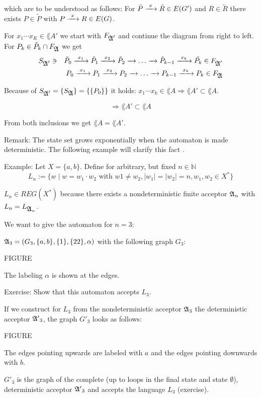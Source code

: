 which are to be understood as follows: For $\tilde{P} \xrightarrow{\ {x}\ } \tilde{R} \in
E(G')$ and $R \in \tilde{R}$ there exists $P \in \tilde{P}$ with $P \xrightarrow{\ {x}\ } R
\in E(G)$.

For $x_1 \cdots x_K \in \lang{A'}$ we start with $F_{\mbox{$\mathfrak{A'}$}}$ and continue
the diagram from right to left. For $P_k \in \tilde{P}_k \cap F_{\mbox{$\mathfrak{A}$}}$ we get
\begin{eqnarray*}
 & S_{\mbox{$\mathfrak{A'}$}} \ni & \tilde{P}_0 \xrightarrow{\ {x_1}\ } \tilde{P}_1 \xrightarrow{\ {x_2}\ } \tilde{P}_2 \xrightarrow{\ {}\ } \ldots
 \xrightarrow{\ {}\ } \tilde{P}_{k-1} \xrightarrow{\ {x_k}\ } \tilde{P_k} \in F_{\mbox{$\mathfrak{A'}$}} \\
 & & P_0 \xrightarrow{\ {x_1}\ } P_1 \xrightarrow{\ {x_2}\ } P_2 \xrightarrow{\ {}\ } \ldots \xrightarrow{\ {}\ }
 P_{k-1} \xrightarrow{\ {x_k}\ } P_k \in F_{\mbox{$\mathfrak{A}$}} 
\end{eqnarray*}

Because of $S_{\mbox{$\mathfrak{A'}$}} = \{ S_{\mbox{$\mathfrak{A}$}} \} = \{\{ P_0 \}\}$ it holds: $x_1
\cdots x_k \in \lang{A} \Rightarrow \lang{A'} \subset \lang{A}$.

\[ \Rightarrow \lang{A'} \subset \lang{A}\]

From both inclusions we get $\lang{A} = \lang{A'}$.

Remark: The state set grows exponentially when the automaton is made
deterministic. The following example will clarify this fact \cite{Commentz}.

Example: Let $X = \{ a, b \}$. Define for arbitrary, but fixed $n \in
\mathbb{N}$ \[ L_n := \{ w \mid w = w_1 \cdot w_2 \mbox{ with } w1 \neq w_2, |w_1| = |w_2|
= n, w_1, w_2 \in X^* \} \]

$L_n \in REG(X^*)$ because there exists a nondeterministic finite acceptor
$\mbox{$\mathfrak{A}$}_{n}$ with $L_n = L_{\mbox{$\mathfrak{A}$}_{n}}$.

We want to give the automaton for $n = 3$:

$\mbox{$\mathfrak{A}$}_3 = (G_3, \{a,b\}, \{1\}, \{22\}, \alpha)$ with the following graph
$G_3$:

FIGURE

The labeling $\alpha$ is shown at the edges.

Exercise: Show that this automaton accepts $L_3$.

If we construct for $L_3$ from the nondeterministic acceptor $\mbox{$\mathfrak{A}$}_3$
the deterministic acceptor $\mbox{$\mathfrak{A'}$}_3$, the graph $G'_3$ looks as follows:

FIGURE

The edges pointing upwards are labeled with $a$ and the edges pointing downwards
with $b$.

$G'_3$ is the graph of the complete (up to loops in the final state and state
$\emptyset$), deterministic acceptor $\mbox{$\mathfrak{A'}$}_3$ and accepts the language $L_3$
(exercise).

